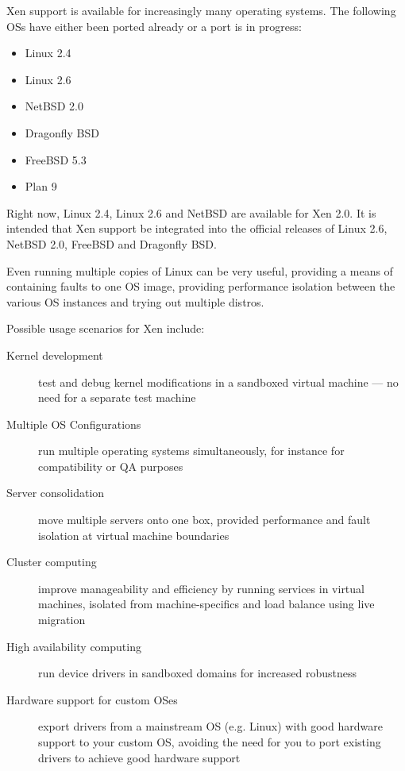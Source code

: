 \documentclass[11pt,twoside,final,openright]{xenstyle}
\begin{document}
Xen support is available for increasingly many operating systems.  The
following OSs have either been ported already or a port is in
progress:
\begin{itemize}
\item Linux 2.4
\item Linux 2.6
\item NetBSD 2.0
\item Dragonfly BSD
\item FreeBSD 5.3
\item Plan 9
\end{itemize}

Right now, Linux 2.4, Linux 2.6 and NetBSD are available for Xen 2.0.
It is intended that Xen support be integrated into the official
releases of Linux 2.6, NetBSD 2.0, FreeBSD and Dragonfly BSD.

Even running multiple copies of Linux can be very useful, providing a
means of containing faults to one OS image, providing performance
isolation between the various OS instances and trying out multiple
distros.


Possible usage scenarios for Xen include:
\begin{description}
\item [Kernel development] test and debug kernel modifications in a
      sandboxed virtual machine --- no need for a separate test
      machine
\item [Multiple OS Configurations] run multiple operating systems
      simultaneously, for instance for compatibility or QA purposes
\item [Server consolidation] move multiple servers onto one box,
      provided performance and fault isolation at virtual machine
      boundaries
\item [Cluster computing] improve manageability and efficiency by
      running services in virtual machines, isolated from
      machine-specifics and load balance using live migration
\item [High availability computing] run device drivers in sandboxed
      domains for increased robustness
\item [Hardware support for custom OSes] export drivers from a
      mainstream OS (e.g. Linux) with good hardware support
      to your custom OS, avoiding the need for you to port existing
      drivers to achieve good hardware support
\end{description}
\end{document}
